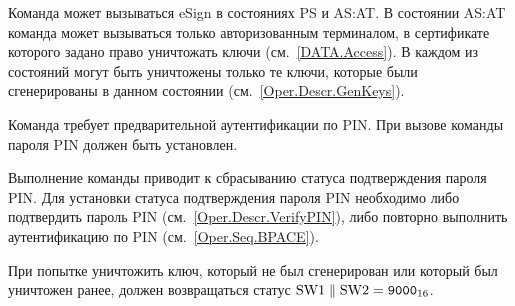 Команда может вызываться  eSign в состояниях 
PS и AS:AT. В состоянии AS:AT команда может вызываться только
авторизованным терминалом, в сертификате которого задано право
уничтожать ключи (см.~\ref{DATA.Access}).
В каждом из состояний могут быть уничтожены только те ключи, которые
были сгенерированы в данном состоянии (см.~\ref{Oper.Descr.GenKeys}).

Команда требует предварительной аутентификации по PIN. 
При вызове команды  пароля PIN 
должен быть установлен.

Выполнение команды приводит к сбрасыванию статуса подтверждения пароля PIN.
Для установки статуса подтверждения пароля PIN 
необходимо либо подтвердить пароль PIN (см.~\ref{Oper.Descr.VerifyPIN}), 
либо повторно выполнить аутентификацию по PIN (см.~\ref{Oper.Seq.BPACE}).

При попытке уничтожить ключ, который не был сгенерирован
или который был уничтожен ранее, должен возвращаться 
статус $\text{SW1} \parallel \text{SW2} = \texttt{9000}_{16}$.